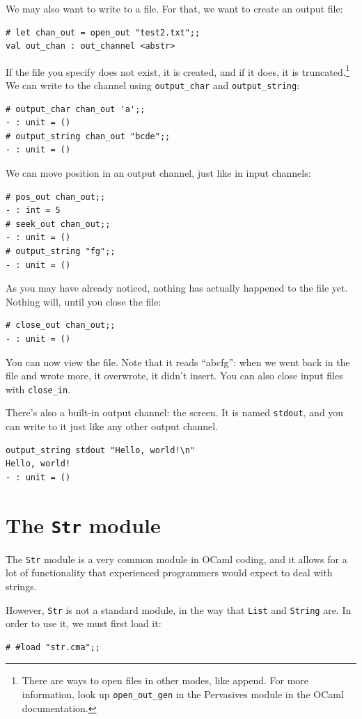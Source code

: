 \documentclass[10pt]{book}
\begin{document}
{We may also want to write to a file. For that, we want to create an output file:
\beforeverb
\begin{verbatim}
# let chan_out = open_out "test2.txt";;
val out_chan : out_channel <abstr>
\end{verbatim}
\afterverb
If the file you specify does not exist, it is created, and if it does, it is truncated.\footnote{There are ways to open files in other modes, like append. For more information, look up {\tt open_out_gen} in the Pervasives module in the OCaml documentation.} We can write to the channel using {\tt output_char} and {\tt output_string}:
\beforeverb
\begin{verbatim}
# output_char chan_out 'a';;
- : unit = ()
# output_string chan_out "bcde";;
- : unit = ()
\end{verbatim}
\afterverb

We can move position in an output channel, just like in input channels:
\beforeverb
\begin{verbatim}
# pos_out chan_out;;
- : int = 5
# seek_out chan_out;;
- : unit = ()
# output_string "fg";;
- : unit = ()
\end{verbatim}
\afterverb

As you may have already noticed, nothing has actually happened to the file yet. Nothing will, until you close the file:
\beforeverb
\begin{verbatim}
# close_out chan_out;;
- : unit = ()
\end{verbatim}
\afterverb
You can now view the file. Note that it reads ``abcfg'': when we went back in the file and wrote more, it overwrote, it didn't insert. You can also close input files with {\tt close_in}.

There's also a built-in output channel: the screen. It is named {\tt stdout}, and you can write to it just like any other output channel.
\beforeverb
\begin{verbatim}
output_string stdout "Hello, world!\n"
Hello, world!
- : unit = ()
\end{verbatim}
\afterverb

\section{The {\tt Str} module}

The {\tt Str} module is a very common module in OCaml coding, and it allows for a lot of functionality that experienced programmers would expect to deal with strings.

However, {\tt Str} is not a standard module, in the way that {\tt List} and {\tt String} are. In order to use it, we must first load it:
\beforeverb
\begin{verbatim}
# #load "str.cma";;
\end{verbatim}
\afterverb

}
\end{document}
